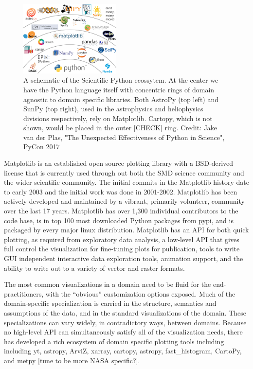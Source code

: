 \documentclass[12pt]{article}
\numberwithin{page}{section}
\begin{document}
\begin{figure}
  \includegraphics[width=0.45\textwidth]{scipy-ecosystem}
  \caption{A schematic of the Scientific Python ecossytem.  At the
    center we have the Python language itself with concentric rings of
    domain agnostic to domain specific libraries.  Both AstroPy (top
    left) and SunPy (top right), used in the astrophysics and
    heliophysics divisions respectively, rely on Matplotlib. Cartopy,
    which is not shown, would be placed in the outer [CHECK] ring.
    Credit: Jake van der Plas, "The Unexpected Effectiveness of Python
    in Science", PyCon 2017}
  \label{fig:ecosystem}
\end{figure}



Matplotlib \cite{Hunter:2007} is an established open source plotting
library with a BSD-derived license that is currently used through out
both the SMD science community and the wider scientific community.
The initial commits in the Matplotlib history date to early 2003 and
the initial work was done in 2001-2002. Matplotlib has been actively
developed and maintained by a vibrant, primarily volunteer, community
over the last 17 years.  Matplotlib has over 1,300 individual
contributors to the code base, is in top 100 most downloaded Python
packages from pypi, and is packaged by every major linux distribution.
Matplotlib has an API for both quick plotting, as required from
exploratory data analysis, a low-level API that gives full control the
visualization for fine-tuning plots for publication, tools to write
GUI independent interactive data exploration tools, animation support,
and the ability to write out to a variety of vector and raster
formats.

The most common visualizations in a domain need to be fluid for the
end-practitioners, with the ``obvious'' customization options
exposed. Much of the domain-specific specialization is carried in the
structure, semantics and assumptions of the data, and in the standard
visualizations of the domain. These specializations can vary widely,
in contradictory ways, between domains. Because no high-level API can
simultaneously satisfy all of the visualization needs, there has
developed a rich ecosystem of domain specific plotting tools including
including yt, astropy, ArviZ, xarray, cartopy, astropy,
fast\_histogram, CartoPy, and metpy [tune to be more NASA specific?].
\end{document}
